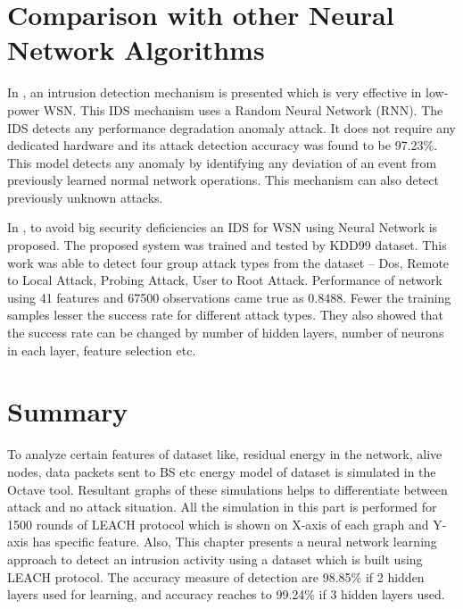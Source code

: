 \section{Comparison with other Neural Network Algorithms}
In \cite{saeed2016random}, an intrusion detection mechanism is presented which is very effective in low-power WSN. This IDS mechanism uses a Random Neural Network (RNN). The IDS detects any performance degradation anomaly attack. It does not require any dedicated hardware and its attack detection accuracy was found to be 97.23\%. This model detects any anomaly by identifying any deviation of an event from previously learned normal network operations. This mechanism can also detect previously unknown attacks.
\par
In \cite{Turkish2015ANN}, to avoid big security deficiencies an IDS for WSN using Neural Network is proposed. The proposed system was trained and tested by KDD99 dataset. This work was able to detect four group attack types from the dataset – Dos, Remote to Local Attack, Probing Attack, User to Root Attack. Performance of network using 41 features and 67500 observations came true as 0.8488. Fewer the training samples lesser the success rate for different attack types. They also showed that the success rate can be changed by number of hidden layers, number of neurons in each layer, feature selection etc.

\section{Summary}
To analyze certain features of dataset like, residual energy in the network, alive nodes, data packets sent to BS etc energy model of dataset is simulated in the Octave tool. Resultant graphs of these simulations helps to differentiate between attack and no attack situation. All the simulation in this part is performed for 1500 rounds of LEACH protocol which is shown on X-axis of each graph and Y-axis has specific feature. Also, This chapter presents a neural network learning approach to detect an intrusion activity using a dataset which is built using LEACH protocol. The accuracy measure of detection are 98.85\% if 2 hidden layers used for learning, and accuracy reaches to 99.24\% if 3 hidden layers used.